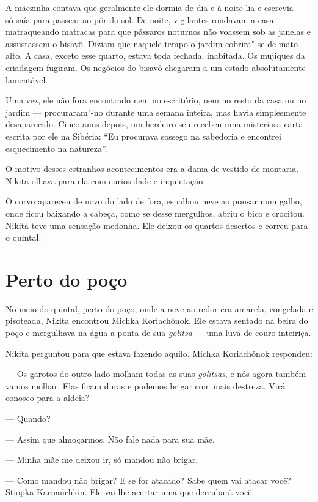 A mãezinha contava que geralmente ele dormia de dia e à noite lia e
escrevia --- só saía para passear ao pôr do sol. De noite, vigilantes
rondavam a casa matraqueando matracas para que pássaros noturnos não
voassem sob as janelas e assustassem o bisavô. Diziam que naquele tempo o
jardim cobrira"-se de mato alto. A casa, exceto esse quarto, estava toda
fechada, inabitada. Os mujiques da criadagem fugiram. Os negócios do
bisavô chegaram a um estado absolutamente lamentável.

Uma vez, ele não fora encontrado nem no escritório, nem no resto da casa
ou no jardim --- procuraram"-no durante uma semana inteira, mas havia
simplesmente desaparecido. Cinco anos depois, um herdeiro seu recebeu
uma misteriosa carta escrita por ele na Sibéria: ``Eu procurava sossego
na sabedoria e encontrei esquecimento na natureza''.

O motivo desses estranhos acontecimentos era a dama de vestido de
montaria. Nikita olhava para ela com curiosidade e inquietação.

O corvo apareceu de novo do lado de fora, espalhou neve ao pousar num
galho, onde ficou baixando a cabeça, como se desse mergulhos, abriu o
bico e crocitou. Nikita teve uma sensação medonha. Ele deixou os quartos
desertos e correu para o quintal.

\chapter{Perto do poço}

No meio do quintal, perto do poço, onde a neve ao redor era amarela,
congelada e pisoteada, Nikita encontrou Michka Koriachónok. Ele
estava sentado na beira do poço e mergulhava na água a ponta de sua
\emph{golitsa} --- uma luva de couro inteiriça.

Nikita perguntou para que estava fazendo aquilo. Michka Koriachónok
respondeu:

--- Os garotos do outro lado molham todas as suas \emph{golitsas}, e nós
agora também vamos molhar. Elas ficam duras e podemos brigar com mais
destreza. Virá conosco para a aldeia?

--- Quando?

--- Assim que almoçarmos. Não fale nada para sua mãe.

--- Minha mãe me deixou ir, só mandou não brigar.

--- Como mandou não brigar? E se for atacado? Sabe quem vai atacar você?
Stiopka Karnaúchkin. Ele vai lhe acertar uma que derrubará você.

